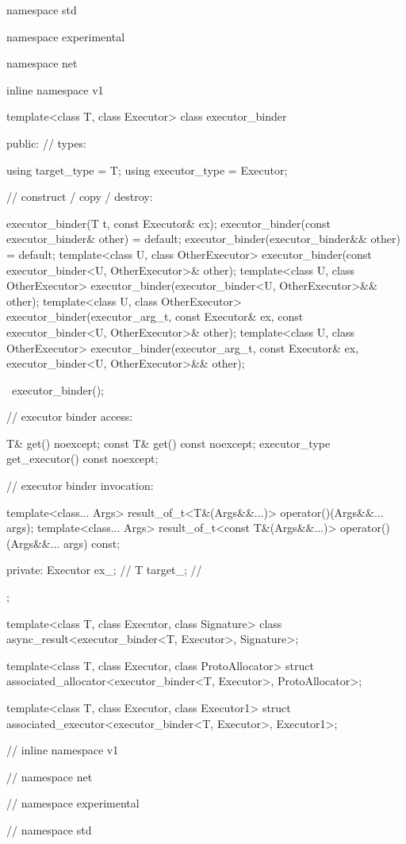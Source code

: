 \begin{codeblock}
namespace std {
namespace experimental {
namespace net {
inline namespace v1 {

  template<class T, class Executor>
  class executor_binder
  {
  public:
    // types:

    using target_type = T;
    using executor_type = Executor;

    // construct / copy / destroy:

    executor_binder(T t, const Executor& ex);
    executor_binder(const executor_binder& other) = default;
    executor_binder(executor_binder&& other) = default;
    template<class U, class OtherExecutor>
      executor_binder(const executor_binder<U, OtherExecutor>& other);
    template<class U, class OtherExecutor>
      executor_binder(executor_binder<U, OtherExecutor>&& other);
    template<class U, class OtherExecutor>
      executor_binder(executor_arg_t, const Executor& ex,
        const executor_binder<U, OtherExecutor>& other);
    template<class U, class OtherExecutor>
      executor_binder(executor_arg_t, const Executor& ex,
        executor_binder<U, OtherExecutor>&& other);

    ~executor_binder();

    // executor binder access:

    T& get() noexcept;
    const T& get() const noexcept;
    executor_type get_executor() const noexcept;

    // executor binder invocation:

    template<class... Args>
      result_of_t<T&(Args&&...)> operator()(Args&&... args);
    template<class... Args>
      result_of_t<const T&(Args&&...)> operator()(Args&&... args) const;

  private:
    Executor ex_; // \expos
    T target_; // \expos
  };

  template<class T, class Executor, class Signature>
    class async_result<executor_binder<T, Executor>, Signature>;

  template<class T, class Executor, class ProtoAllocator>
    struct associated_allocator<executor_binder<T, Executor>, ProtoAllocator>;

  template<class T, class Executor, class Executor1>
    struct associated_executor<executor_binder<T, Executor>, Executor1>;

} // inline namespace v1
} // namespace net
} // namespace experimental
} // namespace std
\end{codeblock}


